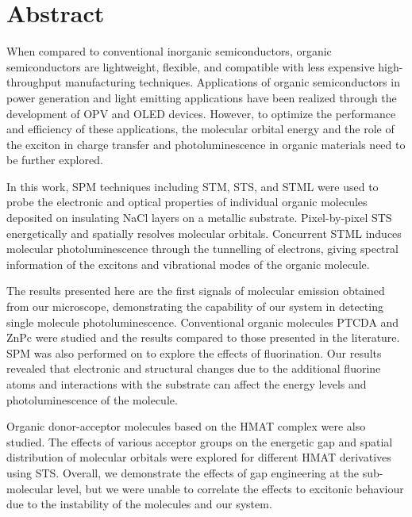 


\chapter{Abstract}


When compared to conventional inorganic semiconductors, organic semiconductors are lightweight, flexible, and compatible with less expensive high-throughput manufacturing techniques. Applications of organic semiconductors in power generation and light emitting applications have been realized through the development of \ac{OPV} and \ac{OLED} devices. However, to optimize the performance and efficiency of these applications, the molecular orbital energy and the role of the exciton in charge transfer and photoluminescence in organic materials need to be further explored.

In this work, \ac{SPM} techniques including \ac{STM}, \ac{STS}, and \ac{STML} were used to probe the electronic and optical properties of individual organic molecules deposited on insulating NaCl layers on a metallic substrate. Pixel-by-pixel \ac{STS} energetically and spatially resolves molecular orbitals. Concurrent \ac{STML} induces molecular photoluminescence through the tunnelling of electrons, giving spectral information of the excitons and vibrational modes of the organic molecule. 

\sloppy The results presented here are the first signals of molecular emission obtained from our microscope, demonstrating the capability of our system in detecting single molecule photoluminescence.  Conventional organic molecules \ac{PTCDA} and \ac{ZnPc} were studied and the results compared to those presented in the literature. \ac{SPM} was also performed on  to explore the effects of fluorination. Our results revealed that electronic and structural changes due to the additional fluorine atoms and interactions with the substrate can affect the energy levels and photoluminescence of the molecule.

\sloppy Organic donor-acceptor molecules based on the \ac{HMAT} complex were also studied. The effects of various acceptor groups on the energetic gap and spatial distribution of molecular orbitals were explored for different \ac{HMAT} derivatives using \ac{STS}. Overall, we demonstrate the effects of gap engineering at the sub-molecular level, but we were unable to correlate the effects to excitonic behaviour due to the instability of the molecules and our system.






\vfill
\begin{center}
\begin{sf}
\end{sf}
\end{center}
